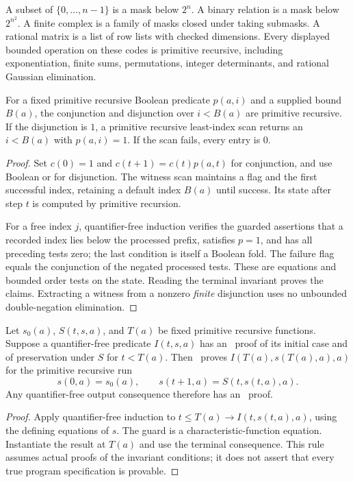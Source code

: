 A subset of $\{0,\ldots,n-1\}$ is a mask below $2^n$. A binary relation is a mask below $2^{n^2}$. A finite complex is a family of masks closed under taking submasks. A rational matrix is a list of row lists with checked dimensions. Every displayed bounded operation on these codes is primitive recursive, including exponentiation, finite sums, permutations, integer determinants, and rational Gaussian elimination.

\begin{lemma}\label{lem:bounded-search}
For a fixed primitive recursive Boolean predicate $p(a,i)$ and a supplied bound $B(a)$, the conjunction and disjunction over $i<B(a)$ are primitive recursive. If the disjunction is $1$, a primitive recursive least-index scan returns an $i<B(a)$ with $p(a,i)=1$. If the scan fails, every entry is $0$.
\end{lemma}
\begin{proof}
Set $c(0)=1$ and $c(t+1)=c(t)p(a,t)$ for conjunction, and use Boolean or for disjunction. The witness scan maintains a flag and the first successful index, retaining a default index $B(a)$ until success. Its state after step $t$ is computed by primitive recursion.

For a free index $j$, quantifier-free induction verifies the guarded assertions that a recorded index lies below the processed prefix, satisfies $p=1$, and has all preceding tests zero; the last condition is itself a Boolean fold. The failure flag equals the conjunction of the negated processed tests. These are equations and bounded order tests on the state. Reading the terminal invariant proves the claims. Extracting a witness from a nonzero \emph{finite} disjunction uses no unbounded double-negation elimination.
\end{proof}

\begin{lemma}\label{lem:loop-rule}
Let $s_0(a)$, $S(t,s,a)$, and $T(a)$ be fixed primitive recursive functions. Suppose a quantifier-free predicate $I(t,s,a)$ has an \ipra\ proof of its initial case and of preservation under $S$ for $t<T(a)$. Then \ipra\ proves $I(T(a),s(T(a),a),a)$ for the primitive recursive run
\[
s(0,a)=s_0(a),\qquad s(t+1,a)=S(t,s(t,a),a).
\]
Any quantifier-free output consequence therefore has an \ipra\ proof.
\end{lemma}
\begin{proof}
Apply quantifier-free induction to
$t\leq T(a)\to I(t,s(t,a),a)$, using the defining equations of $s$. The guard is a characteristic-function equation. Instantiate the result at $T(a)$ and use the terminal consequence. This rule assumes actual proofs of the invariant conditions; it does not assert that every true program specification is provable.
\end{proof}

